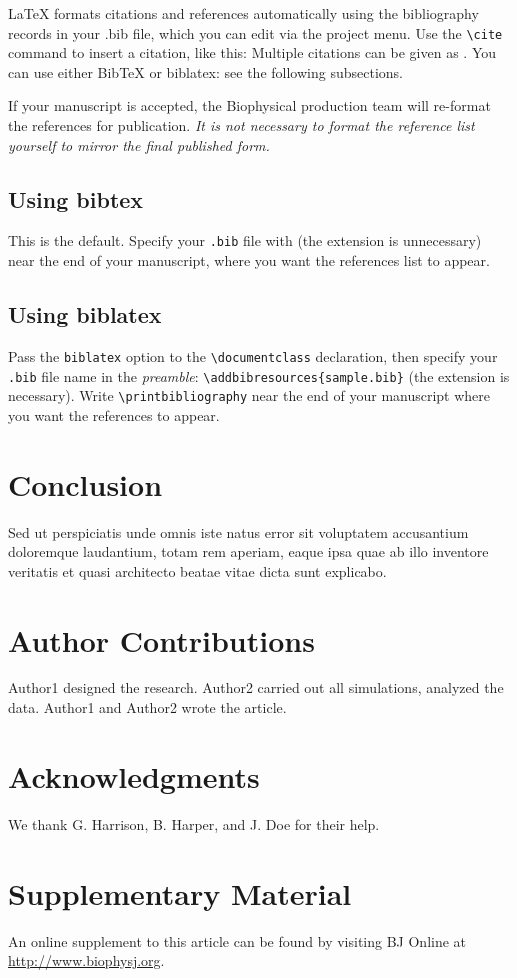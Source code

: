 \documentclass{biophys-new}
\begin{document}
\LaTeX{} formats citations and references automatically using the bibliography records in your .bib file, which you can edit via the project menu. Use the \verb|\cite| command to insert a citation, like this: \cite{Chen_Nicholson00} Multiple citations can be given as \cite{Stiles_Bartol01,el-Kareh_etal93,Callaghan91}. You can use either BibTeX or biblatex: see the following subsections.

If your manuscript is accepted, the Biophysical production team will re-format the references for publication. \emph{It is not necessary to format the reference list yourself to mirror the final published form.}

\subsection*{Using bibtex} 
This is the default. Specify your \texttt{.bib} file with \verb|| (the extension is unnecessary) near the end of your manuscript, where you want the references list to appear.

\subsection*{Using biblatex} 
Pass the \texttt{biblatex} option to the \verb|\documentclass| declaration, then specify your \texttt{.bib} file name in the \emph{preamble}: \verb|\addbibresources{sample.bib}| (the extension is necessary). Write \verb|\printbibliography| near the end of your manuscript where you want the references to appear.

\section*{Conclusion}

Sed ut perspiciatis unde omnis iste natus error sit voluptatem accusantium doloremque laudantium, totam rem aperiam, eaque ipsa quae ab illo inventore veritatis et quasi architecto beatae vitae dicta sunt explicabo. 

\section*{Author Contributions}

Author1 designed the research. Author2 carried out all simulations, analyzed the data. Author1 and Author2 wrote the article. 

\section*{Acknowledgments}

We thank G. Harrison, B. Harper, and J. Doe for their help.




\section*{Supplementary Material}

An online supplement to this article can be found by visiting BJ Online at \url{http://www.biophysj.org}.
\end{document}
